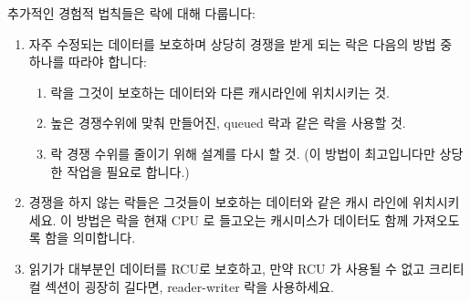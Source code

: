 추가적인 경험적 법칙들은 락에 대해 다룹니다:

\begin{enumerate}
\item	자주 수정되는 데이터를 보호하며 상당히 경쟁을 받게 되는 락은 다음의
	방법 중 하나를 따라야 합니다:
	\begin{enumerate}
	\item	락을 그것이 보호하는 데이터와 다른 캐시라인에 위치시키는 것.
	\item	높은 경쟁수위에 맞춰 만들어진, queued 락과 같은 락을 사용할 것.
	\item	락 경쟁 수위를 줄이기 위해 설계를 다시 할 것.
		(이 방법이 최고입니다만 상당한 작업을 필요로 합니다.)
	\end{enumerate}

\item	경쟁을 하지 않는 락들은 그것들이 보호하는 데이터와 같은 캐시 라인에
	위치시키세요.
	이 방법은 락을 현재 CPU 로 들고오는 캐시미스가 데이터도 함께 가져오도록
	함을 의미합니다.
\item	읽기가 대부분인 데이터를 RCU로 보호하고, 만약 RCU 가 사용될 수 없고
	크리티컬 섹션이 굉장히 길다면, reader-writer 락을 사용하세요.

\end{enumerate}

